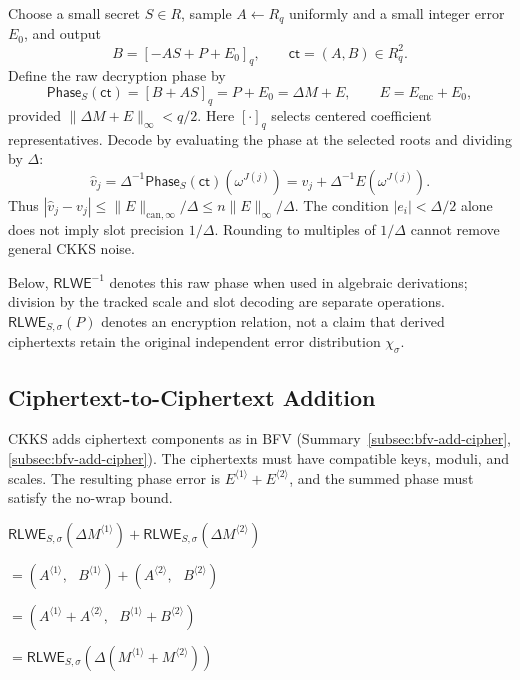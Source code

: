 \begin{tcolorbox}[title={\textbf{\tboxlabel{\ref*{subsec:ckks-enc-dec}} CKKS Encryption and Decryption}}]
Choose a small secret $S\in R$, sample $A\leftarrow R_q$ uniformly and a small integer error $E_0$, and output
\[
B=[-AS+P+E_0]_q,\qquad \textsf{ct}=(A,B)\in R_q^2.
\]
Define the raw decryption phase by
\[
\mathsf{Phase}_S(\textsf{ct})=[B+AS]_q=P+E_0=\Delta M+E,
\qquad E=E_{\mathrm{enc}}+E_0,
\]
provided $\|\Delta M+E\|_\infty<q/2$. Here $[\cdot]_q$ selects centered coefficient representatives. Decode by evaluating the phase at the selected roots and dividing by $\Delta$:
\[
\widehat v_j=\Delta^{-1}\mathsf{Phase}_S(\textsf{ct})(\omega^{J(j)})
=v_j+\Delta^{-1}E(\omega^{J(j)}).
\]
Thus $|\widehat v_j-v_j|\leq\|E\|_{\mathrm{can},\infty}/\Delta\leq n\|E\|_\infty/\Delta$. The condition $|e_i|<\Delta/2$ alone does not imply slot precision $1/\Delta$. Rounding to multiples of $1/\Delta$ cannot remove general CKKS noise.
\end{tcolorbox}

Below, $\textsf{RLWE}^{-1}$ denotes this raw phase when used in algebraic derivations; division by the tracked scale and slot decoding are separate operations. $\textsf{RLWE}_{S,\sigma}(P)$ denotes an encryption relation, not a claim that derived ciphertexts retain the original independent error distribution $\chi_\sigma$.

\subsection{Ciphertext-to-Ciphertext Addition}
\label{subsec:ckks-add-cipher}

CKKS adds ciphertext components as in BFV (Summary~\ref*{subsec:bfv-add-cipher}, \autoref{subsec:bfv-add-cipher}). The ciphertexts must have compatible keys, moduli, and scales. The resulting phase error is $E^{\langle1\rangle}+E^{\langle2\rangle}$, and the summed phase must satisfy the no-wrap bound.




\begin{tcolorbox}[title={\textbf{\tboxlabel{\ref*{subsec:ckks-add-cipher}} CKKS Ciphertext-to-Ciphertext Addition}}]
$\textsf{RLWE}_{S, \sigma}(\Delta M^{\langle 1 \rangle} ) + \textsf{RLWE}_{S, \sigma}(\Delta M^{\langle 2 \rangle} ) $

$ = ( A^{\langle 1 \rangle}, \text{ } B^{\langle 1 \rangle}) + (A^{\langle 2 \rangle}, \text{ } B^{\langle 2 \rangle}) $

$ = ( A^{\langle 1 \rangle} + A^{\langle 2 \rangle}, \text{ } B^{\langle 1 \rangle} + B^{\langle 2 \rangle} ) $

$= \textsf{RLWE}_{S, \sigma}(\Delta(M^{\langle 1 \rangle} + M^{\langle 2 \rangle}) )$
\end{tcolorbox}



